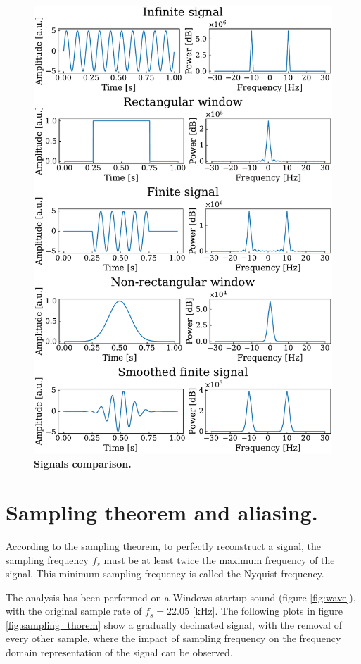 \documentclass[13pt,a4paper]{article}
\begin{document}
\begin{figure}[ht!]
    \centering
    \includegraphics[width=0.9\linewidth]{spectra_comparison.pdf}
    \caption{\textbf{Signals comparison.}}
    \label{fig:comparison}
\end{figure}
\clearpage


\section{Sampling theorem and aliasing.}

According to the sampling theorem, to perfectly reconstruct a signal, the sampling frequency $f_s$ must be at least twice the maximum frequency of the signal. This minimum sampling frequency is called the Nyquist frequency.

The analysis has been performed on a Windows startup sound (figure \ref{fig:wave}), with the original sample rate of $f_s=22.05$ [kHz]. The following plots in figure \ref{fig:sampling_thorem} show a gradually decimated signal, with the removal of every other sample, where the impact of sampling frequency on the frequency domain representation of the signal can be observed.
\end{document}
